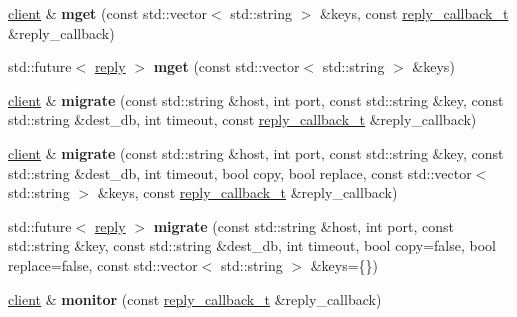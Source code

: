 \begin{DoxyCompactItemize}
\mbox{\label{classcpp__redis_1_1client_a946b590d9a2a29ee6ae1971b9208a241}} 
\mbox{\hyperlink{classcpp__redis_1_1client}{client}} \& {\bfseries mget} (const std\+::vector$<$ std\+::string $>$ \&keys, const \mbox{\hyperlink{classcpp__redis_1_1client_af7a65eb21aa25230bfbb0b0203c4fc04}{reply\+\_\+callback\+\_\+t}} \&reply\+\_\+callback)
\item 
\mbox{\label{classcpp__redis_1_1client_a8c08062c8414fd72d1a0b3ef4f44d89d}} 
std\+::future$<$ \mbox{\hyperlink{classcpp__redis_1_1reply}{reply}} $>$ {\bfseries mget} (const std\+::vector$<$ std\+::string $>$ \&keys)
\item 
\mbox{\label{classcpp__redis_1_1client_acfbf3cb40c0cd532e42d725bbda9a03a}} 
\mbox{\hyperlink{classcpp__redis_1_1client}{client}} \& {\bfseries migrate} (const std\+::string \&host, int port, const std\+::string \&key, const std\+::string \&dest\+\_\+db, int timeout, const \mbox{\hyperlink{classcpp__redis_1_1client_af7a65eb21aa25230bfbb0b0203c4fc04}{reply\+\_\+callback\+\_\+t}} \&reply\+\_\+callback)
\item 
\mbox{\label{classcpp__redis_1_1client_a671442669b8fe540bfc7d02c05a74207}} 
\mbox{\hyperlink{classcpp__redis_1_1client}{client}} \& {\bfseries migrate} (const std\+::string \&host, int port, const std\+::string \&key, const std\+::string \&dest\+\_\+db, int timeout, bool copy, bool replace, const std\+::vector$<$ std\+::string $>$ \&keys, const \mbox{\hyperlink{classcpp__redis_1_1client_af7a65eb21aa25230bfbb0b0203c4fc04}{reply\+\_\+callback\+\_\+t}} \&reply\+\_\+callback)
\item 
\mbox{\label{classcpp__redis_1_1client_a1bbf11a4ebd3dcf12d9846946e5c3545}} 
std\+::future$<$ \mbox{\hyperlink{classcpp__redis_1_1reply}{reply}} $>$ {\bfseries migrate} (const std\+::string \&host, int port, const std\+::string \&key, const std\+::string \&dest\+\_\+db, int timeout, bool copy=false, bool replace=false, const std\+::vector$<$ std\+::string $>$ \&keys=\{\})
\item 
\mbox{\label{classcpp__redis_1_1client_ad99627cb477d71f07fae0f88ed8ed85b}} 
\mbox{\hyperlink{classcpp__redis_1_1client}{client}} \& {\bfseries monitor} (const \mbox{\hyperlink{classcpp__redis_1_1client_af7a65eb21aa25230bfbb0b0203c4fc04}{reply\+\_\+callback\+\_\+t}} \&reply\+\_\+callback)

\end{DoxyCompactItemize}
